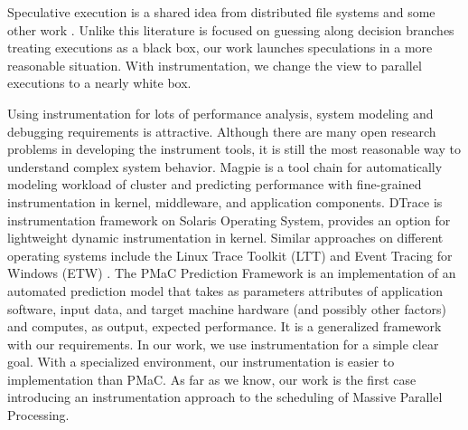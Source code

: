 Speculative execution is a shared idea from distributed file systems \cite{Nightingale:2006:SED:1189256.1189258} and some other work \cite{Su:2007:AIC:1294261.1294284} . Unlike this literature is focused on guessing along decision branches treating executions as a black box, our work launches speculations in a more reasonable situation. With instrumentation, we change the view to parallel executions to a nearly white box.

Using instrumentation for lots of performance analysis, system modeling and debugging requirements is attractive. Although there are many open research problems in developing the instrument tools, it is still the most reasonable way to understand complex system behavior. Magpie \cite{Barham:2004:UMR:1251254.1251272} is a tool chain for automatically modeling workload of cluster and predicting performance with fine-grained instrumentation in kernel, middleware, and application components. DTrace \cite{Cantrill:2004:DIP:1247415.1247417} is instrumentation framework on Solaris Operating System, provides an option for lightweight dynamic instrumentation in kernel. Similar approaches on different operating systems include the Linux Trace Toolkit (LTT) \cite{Yaghmour:2000:MCS:1267724.1267726} and Event Tracing for Windows (ETW) \cite{etw}. The PMaC Prediction Framework \cite{Carrington:2006:PPF:1134241.1708446} is an implementation of an automated prediction model that takes as parameters attributes of application software, input data, and target machine hardware (and possibly other factors) and computes, as output, expected performance. It is a generalized framework with our requirements. In our work, we use instrumentation for a simple clear goal. With a specialized environment, our instrumentation is easier to implementation than PMaC. As far as we know, our work is the first case introducing an instrumentation approach to the scheduling of Massive Parallel Processing.

